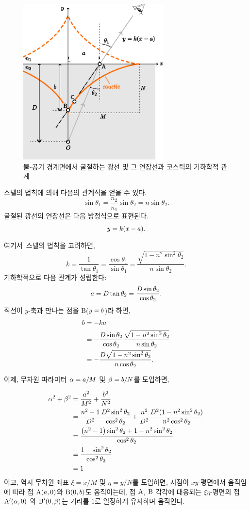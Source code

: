 \documentclass[twocolumn]{article}
\begin{document}
\begin{figure}
	\centering
	\includegraphics[width=3in]{figs/g237.eps}
	\caption{물-공기 경계면에서 굴절하는 광선 및 그 연장선과 코스틱의 기하학적 관계}
	\label{fig:geometry}
\end{figure}

스넬의 법칙에 의해 다음의 관계식을 얻을 수 있다.
$$ \sin\theta_1 = \frac{n_2}{n_1} \sin\theta_2 = n\sin\theta_2.$$
굴절된 광선의 연장선은 다음 방정식으로 표현된다.
$$y=k(x-{a}).$$

여기서 스넬의 법칙을 고려하면,
$$k=\dfrac{1}{\tan\theta_1}=\dfrac{\cos\theta_1}{\sin\theta_1}
	=\dfrac{\sqrt{1-n^2\sin^2\theta_2}}{n\sin\theta_2}.$$
기하학적으로 다음 관계가 성립한다:
$${a} = D\tan\theta_2 = \dfrac{D\sin\theta_2}{\cos\theta_2}.$$
직선이 $y$-축과 만나는 점을 B($y={b}$)라 하면,
$$\begin{aligned}
	{b} &= -k{a} \\
	&= -\dfrac{D\sin\theta_2}{\cos\theta_2}
	\dfrac{\sqrt{1-n^2\sin^2\theta_2}}{n\sin\theta_2}\\
	&=-\dfrac{D\sqrt{1-n^2\sin^2\theta_2}}{n\cos\theta_2}.
\end{aligned}$$

이제, 무차원 파라미터 ${\alpha}={a}/M$ 및 ${\beta}={b}/N$를 도입하면,

$$ \begin{aligned}
	\greeka^2 + \greekb^2 &= \dfrac{\romana^2}{M^2}+\dfrac{\romanb^2}{N^2}\\
	&=\dfrac{n^2-1}{D^2}\dfrac{D^2\sin^2\theta_2}{\cos^2\theta_2}%
	+\dfrac{n^2}{D^2}\dfrac{D^2(1-n^2\sin^2\theta_2)}{n^2\cos^2\theta_2}\\
	&=\dfrac{\left(n^2-1\right)\sin^2\theta_2 + 1-n^2\sin^2\theta_2}
	{\cos^2\theta_2}\\
	&=\dfrac{1-\sin^2\theta_2}{\cos^2\theta_2}\\
	&= 1
\end{aligned}$$
%
이고, 역시 무차원 좌표 $\xi=x/M$ 및 $\eta=y/N$를 도입하면, 시점이 $xy$-평면에서 움직임에 따라 점 $\mathrm{{A}}({a}, 0)$와 $\mathrm{{B}}(0, {b})$도 움직이는데, 점 $\mathrm{{A}}$, $\mathrm{{B}}$ 각각에 대응되는  $\xi\eta$-평면의 점 $\mathrm{{A^{\prime}}}({\alpha}, 0)$
와 $\mathrm{{B^{\prime}}}(0, {\beta})$는 거리를 $1$로 일정하게 유지하며 움직인다.
\end{document}
